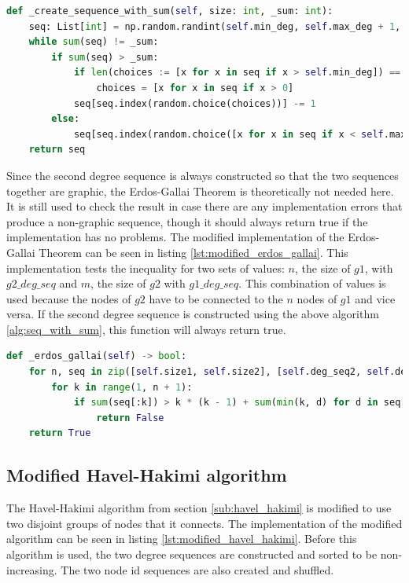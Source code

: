 \begin{lstlisting}[language=python, caption={Algorithm for creating a sequence with specific sum}, label={lst:seq_with_sum}]
def _create_sequence_with_sum(self, size: int, _sum: int):
    seq: List[int] = np.random.randint(self.min_deg, self.max_deg + 1, size=(size)).tolist()
    while sum(seq) != _sum:
        if sum(seq) > _sum:
            if len(choices := [x for x in seq if x > self.min_deg]) == 0:
                choices = [x for x in seq if x > 0]
            seq[seq.index(random.choice(choices))] -= 1
        else:
            seq[seq.index(random.choice([x for x in seq if x < self.max_deg]))] += 1
    return seq
\end{lstlisting}

Since the second degree sequence is always constructed so that the two sequences together are graphic, the Erdos-Gallai Theorem is theoretically not needed here. It is still used to check the result in case there are any implementation errors that produce a non-graphic sequence, though it should always return true if the implementation has no problems. The modified implementation of the Erdos-Gallai Theorem can be seen in listing \ref{lst:modified_erdos_gallai}. This implementation tests the inequality for two sets of values: $n$, the size of $g1$, with $g2\_deg\_seq$ and $m$, the size of $g2$ with $g1\_deg\_seq$. This combination of values is used because the nodes of $g2$ have to be connected to the $n$ nodes of $g1$ and vice versa. If the second degree sequence is constructed using the above algorithm \ref{alg:seq_with_sum}, this function will always return true.

\begin{lstlisting}[language=python, caption={Modified Erdos-Gallai Theorem for connecting to disjunct groups}, label={lst:modified_erdos_gallai}]
def _erdos_gallai(self) -> bool:
    for n, seq in zip([self.size1, self.size2], [self.deg_seq2, self.deg_seq1]):
        for k in range(1, n + 1):
            if sum(seq[:k]) > k * (k - 1) + sum(min(k, d) for d in seq[k + 1 :]):
                return False
    return True
\end{lstlisting}



\subsection{Modified Havel-Hakimi algorithm}
The Havel-Hakimi algorithm from section \ref{sub:havel_hakimi} is modified to use two disjoint groups of nodes that it connects. The implementation of the modified algorithm can be seen in listing \ref{lst:modified_havel_hakimi}. Before this algorithm is used, the two degree sequences are constructed and sorted to be non-increasing. The two node id sequences are also created and shuffled.

